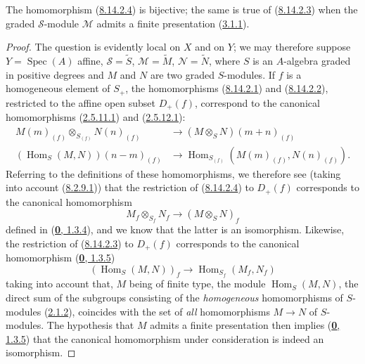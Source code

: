 \begin{proposition}[8.14.3]
\label{II.8.14.3}
The homomorphism \textup{(\hyperref[II.8.14.2.4]{8.14.2.4})} is bijective; the
same is true of \textup{(\hyperref[II.8.14.2.3]{8.14.2.3})} when the
graded $\mathcal{S}$-module $\mathcal{M}$ admits a finite presentation
\textup{(\hyperref[II.3.1.1]{3.1.1})}.
\end{proposition}

\begin{proof}
The question is evidently local on $X$ and on $Y$; we may therefore suppose
$Y=\operatorname{Spec}(A)$ affine, $\mathcal{S}=\widetilde{S}$,
$\mathcal{M}=\widetilde{M}$, $\mathcal{N}=\widetilde{N}$, where $S$ is an
$A$-algebra graded in positive degrees and $M$ and $N$ are two graded
$S$-modules. If $f$ is a homogeneous element of $S_+$, the homomorphisms
(\hyperref[II.8.14.2.1]{8.14.2.1}) and
(\hyperref[II.8.14.2.2]{8.14.2.2}), restricted to the affine open subset
$D_+(f)$, correspond to the canonical homomorphisms
(\hyperref[II.2.5.11.1]{2.5.11.1}) and
(\hyperref[II.2.5.12.1]{2.5.12.1}):
\begin{align*}
  M(m)_{(f)}\otimes_{S_{(f)}}N(n)_{(f)}
  &\to(M\otimes_S N)(m+n)_{(f)}\\
  (\operatorname{Hom}_S(M,N))(n-m)_{(f)}
  &\to\operatorname{Hom}_{S_{(f)}}(M(m)_{(f)},N(n)_{(f)}).
\end{align*}
Referring to the definitions of these homomorphisms, we therefore see (taking
into account (\hyperref[II.8.2.9.1]{8.2.9.1})) that the restriction of
(\hyperref[II.8.14.2.4]{8.14.2.4}) to $D_+(f)$ corresponds to
the canonical homomorphism
\[
  M_f\otimes_{S_f}N_f\to(M\otimes_S N)_f
\]
defined in (\hyperref[0.1.3.4]{\textbf{0}, 1.3.4}), and we know that the latter is
an isomorphism. Likewise, the restriction of
(\hyperref[II.8.14.2.3]{8.14.2.3}) to $D_+(f)$ corresponds to
the canonical homomorphism (\hyperref[0.1.3.5]{\textbf{0}, 1.3.5})
\[
  (\operatorname{Hom}_S(M,N))_f\to
  \operatorname{Hom}_{S_f}(M_f,N_f)
\]
taking into account that, $M$ being of finite type, the module
$\operatorname{Hom}_S(M,N)$, the direct sum of the subgroups consisting of the
\emph{homogeneous} homomorphisms of $S$-modules
(\hyperref[II.2.1.2]{2.1.2}), coincides with the set of \emph{all}
homomorphisms $M\to N$ of $S$-modules. The hypothesis that $M$ admits a
finite presentation then implies (\hyperref[0.1.3.5]{\textbf{0}, 1.3.5}) that
the canonical homomorphism under consideration is indeed an isomorphism.
\end{proof}

